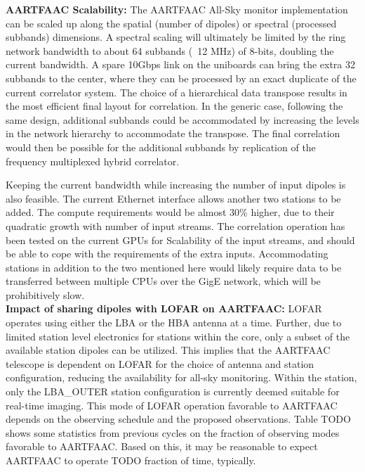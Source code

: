\documentclass{ws-jai}
\begin{document}
\noindent  \textbf   {AARTFAAC  Scalability:}   The  AARTFAAC   All-Sky  monitor
implementation  can be  scaled  up  along the  spatial  (number  of dipoles)  or
spectral (processed subbands) dimensions. A  spectral scaling will ultimately be
limited by the ring network bandwidth to  about 64 subbands (~12 MHz) of 8-bits,
doubling the current  bandwidth. A spare 10Gbps link on  the uniboards can bring
the extra  32 subbands to the  center, where they  can be processed by  an exact
duplicate of the  current correlator system.  The choice of  a hierarchical data
transpose results  in the most efficient  final layout for correlation.   In the
generic  case,  following   the  same  design,  additional   subbands  could  be
accommodated by  increasing the levels  in the network hierarchy  to accommodate
the transpose.  The final correlation would  then be possible for the additional
subbands by replication of the frequency multiplexed hybrid correlator.

Keeping the  current bandwidth while increasing  the number of input  dipoles is
also feasible. The current Ethernet interface  allows another two stations to be
added.   The compute  requirements would  be almost  30\% higher,  due to  their
quadratic growth  with number of  input streams.  The correlation  operation has
been tested on the current GPUs for Scalability of the input streams, and should
be  able to  cope  with the  requirements of  the  extra inputs.   Accommodating
stations in addition to  the two mentioned here would likely  require data to be
transferred  between  multiple  CPUs  over  the  GigE  network,  which  will  be
prohibitively slow.\\

\noindent  \textbf {Impact  of sharing  dipoles with  LOFAR on  AARTFAAC:} LOFAR
operates using  either the LBA  or the  HBA antenna at  a time. Further,  due to
limited station level electronics for stations within the core, only a subset of
the available  station dipoles can be  utilized. This implies that  the AARTFAAC
telescope  is  dependent  on  LOFAR  for  the  choice  of  antenna  and  station
configuration,  reducing the  availability  for all-sky  monitoring. Within  the
station, only the LBA\_OUTER station  configuration is currently deemed suitable
for  real-time imaging.   This mode  of  LOFAR operation  favorable to  AARTFAAC
depends on  the observing  schedule and the  proposed observations.   Table TODO
shows some  statistics from previous cycles  on the fraction of  observing modes
favorable to AARTFAAC. Based on this, it may be reasonable to expect AARTFAAC to
operate TODO fraction of time, typically.\\
\end{document}
